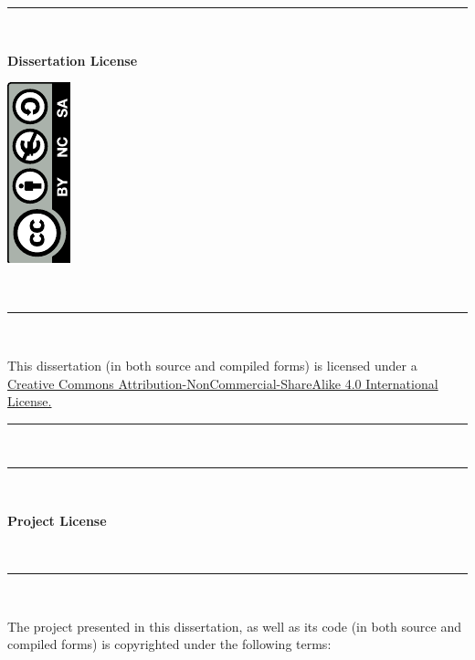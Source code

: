 \documentclass[a4paper, 12pt]{report}
\begin{document}
\begin{titlepage}	
	\rule{\linewidth}{0.5mm} \\[0.1cm]
	\begin{minipage}{0.5\textwidth}
		\Large{\textbf{Dissertation License}}
	\end{minipage}
	\begin{minipage}{0.5\textwidth}
		\begin{flushright}
			\includegraphics[angle=-90]{by-nc-sa}
		\end{flushright}
	\end{minipage}
	\\[0.1cm]
	\rule{\linewidth}{0.5mm} \\[0.1cm]
	\noindent
	\begin{center}
		This dissertation (in both source and compiled forms) is licensed under a\\
		\href{http://creativecommons.org/licenses/by-nc-sa/4.0/}{Creative Commons Attribution-NonCommercial-ShareAlike 4.0 International License.}
	\end{center}	
	\rule{\linewidth}{0.5mm} \\[1.5cm]
	\noindent
	\rule{\linewidth}{0.5mm} \\[0.4cm]
	\begin{minipage}{0.5\textwidth}
		\Large{\textbf{Project License}}
	\end{minipage}
	\begin{minipage}{0.5\textwidth}
		\begin{flushright}
			\Huge{\textcopyright}
		\end{flushright}
	\end{minipage}
	\\[0.1cm]
	\rule{\linewidth}{0.5mm} \\[0.1cm]
	\noindent
	\begin{center}
		The project presented in this dissertation, as well as its code (in both source and compiled forms) is copyrighted under the following terms:
	\end{center}

\end{titlepage}
\end{document}
